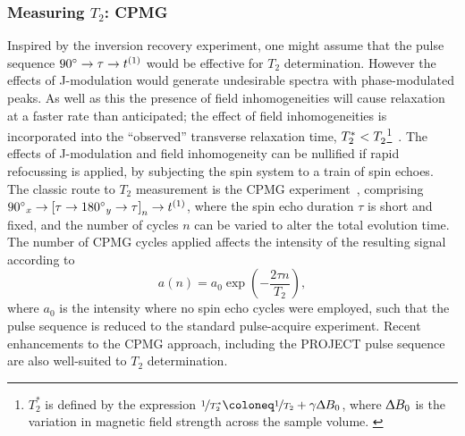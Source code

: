 \subsubsection{Measuring $T_2$: \acs{CPMG}}
\label{subsec:cpmg}
Inspired by the inversion recovery experiment, one might assume
that the pulse sequence $\ang{90} \rightarrow \tau \rightarrow t^{(1)}$ would be
effective for  $T_2$ determination. However the effects of J-modulation would
generate undesirable spectra with phase-modulated peaks. As well as this the
presence of field inhomogeneities will cause relaxation at a faster rate than
anticipated; the effect of field inhomogeneities is incorporated into the
``observed'' transverse relaxation time, $T_2^* < T_2^{\vphantom{*}}$\footnote{
    $T_2^*$ is defined by the expression
    $\nicefrac{1}{T_2^*} \coloneq \nicefrac{1}{T_2} + \gamma \Updelta B_0$,
    where $\Updelta B_0$ is the variation in magnetic field strength across the
    sample volume.
    \label{fn:t2-star}
}~\cite{Chavhan2009}. The effects of
J-modulation and field inhomogeneity can be nullified if rapid refocussing is
applied, by subjecting the spin system to a train of spin echoes. The classic
route to $T_2$ measurement is the \ac{CPMG}
experiment~\cite{Carr1954,Meiboom1958}, comprising $\ang{90}_x \rightarrow
\left[ \tau \rightarrow \ang{180}_y \rightarrow \tau \right]_n \rightarrow
t^{(1)}$, where the spin echo duration $\tau$ is short and fixed, and the number
of cycles $n$ can be varied to alter the total evolution time. The number of
\ac{CPMG} cycles applied affects the intensity of the resulting signal
according to
\begin{equation}
    a(n) = a_0 \exp\left(-\frac{2 \tau n}{T_2}\right),
\end{equation}
where $a_0$ is the intensity where no spin echo cycles were employed, such that
the pulse sequence is reduced to the standard pulse-acquire experiment. Recent
enhancements to the \ac{CPMG} approach, including the \ac{PROJECT} pulse
sequence~\cite{Aguilar2012} are also well-suited to $T_2$ determination.

